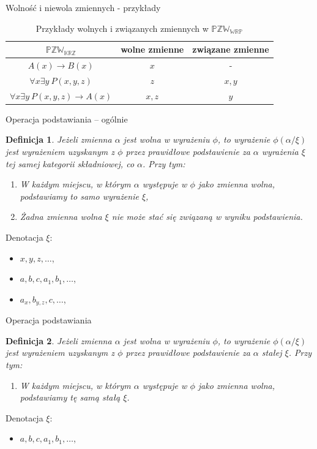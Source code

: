 \documentclass{beamer}
\newtheorem{definicja}{Definicja}
\newcommand {\PZWKRZ} {\ensuremath{\mathbb{PZW_{KRZ}}}}
\newcommand {\PZWWRP} {\ensuremath{\mathbb{PZW_{WRP}}}}
\begin{document}
\begin{frame}{Wolność i niewola zmiennych - przykłady}
\begin{table}[p]
\caption{Przykłady wolnych i związanych zmiennych  w \PZWWRP}
\begin{center}
\begin{tabular}{|c|c|c|}
\hline
\textbf{\PZWKRZ} & \textbf{wolne zmienne} & \textbf{związane zmienne}\\
\hline
$A(x) \to B(x)$& $x$ & -\\
\hline
$\forall x \exists y~ P(x,y,z)$ & $z$ & $x, y$\\
\hline
$\forall x \exists y~ P(x,y,z)\to A(x)$ & $x,z$ & $y$ \\
\hline
\end{tabular}
\end{center}
\label{Przyklady wolnosci}
\end{table}
\end{frame}

\begin{frame}{Operacja podstawiania -- ogólnie}
%
\begin{definicja}
Jeżeli zmienna $\alpha$ jest wolna w wyrażeniu $\phi$, to wyrażenie $\phi(\alpha / \xi)$ jest wyrażeniem uzyskanym z $\phi$ przez prawidłowe podstawienie za $\alpha$ wyrażenia $\xi$ tej samej kategorii składniowej, co $\alpha$. Przy tym:
%
\begin{enumerate}
\item W każdym miejscu, w którym $\alpha$ występuje w $\phi$ jako zmienna wolna, podstawiamy to samo wyrażenie $\xi$,
%
\item Żadna zmienna wolna $\xi$ nie może stać się związaną w wyniku podstawienia.
\end{enumerate}
\end{definicja}
%
Denotacja $\xi$:
\begin{itemize}
\item $x, y, z, \dots$,
\item $a, b, c, a_{1}, b_{1}, \dots$,
\item $a_x, b_{y,z}, c, \dots$,
\end{itemize}
\end{frame}

\begin{frame}{Operacja podstawiania}
%
\begin{definicja}
Jeżeli zmienna $\alpha$ jest wolna w wyrażeniu $\phi$, to wyrażenie $\phi(\alpha / \xi)$ jest wyrażeniem uzyskanym z $\phi$ przez prawidłowe podstawienie za $\alpha$ stałej $\xi$. Przy tym:
\begin{enumerate}
\item W każdym miejscu, w którym $\alpha$ występuje w $\phi$ jako zmienna wolna, podstawiamy tę samą stałą $\xi$.
\end{enumerate}
\end{definicja}
%
Denotacja $\xi$:
\begin{itemize}
\item $a, b, c, a_{1}, b_{1}, \dots$,
\end{itemize}
\end{frame}
\end{document}
